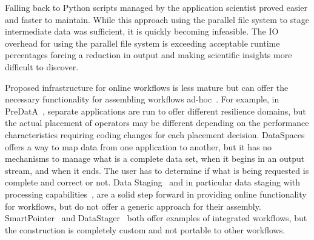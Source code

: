 \documentclass[conference]{IEEEtran}
\newcommand{\ada}[1]{\textcolor{red}{Ada: #1}}
\begin{document}

Falling back to Python
scripts managed by the application scientist proved easier and faster to
maintain. While this approach using the parallel file system to stage
intermediate data was sufficient, it is quickly becoming infeasible. The IO
overhead for using the parallel file system is exceeding acceptable runtime
percentages forcing a reduction in output and making scientific insights more
difficult to discover. 
\fi

Proposed infrastructure for online workflows is less mature but can offer
the necessary functionality for assembling workflows
ad-hoc~\cite{zheng:2010:predata,docan:2010:dataspaces,wolf:2002:smartpointer,abbasi:2009:datastager}.
For example, in PreDatA~\cite{zheng:2010:predata}, separate applications are
run to offer different resilience domains, but the actual placement of
operators may be different depending on the performance characteristics requiring
coding changes for each placement decision.
DataSpaces~\cite{docan:2010:dataspaces} offers a way to map data from one
application to another, but it has no mechanisms to manage what is a complete
data set, when it begins in an output stream, and when it ends. The user has to
determine if what is being requested is complete and correct or not.
Data Staging~\cite{nisar:2008:staging} and in particular
data staging with processing
capabilities~\cite{abbasi:2009:datastager,ober:seismic}, are a solid step
forward in providing online functionality for workflows, but do not 
offer a generic approach for their assembly.
SmartPointer~\cite{wolf:2002:smartpointer} and
DataStager~\cite{abbasi:2009:datastager} both offer examples of integrated
workflows, but the construction is completely custom and not portable to other
workflows.

\end{document}
